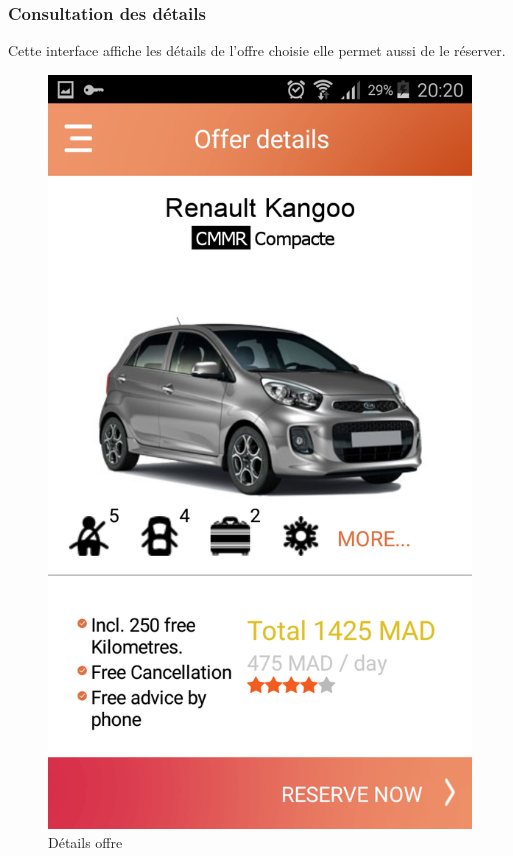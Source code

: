 \documentclass[12pt,a4paper]{report}
\begin{document}
	\subsubsection{Consultation des détails}
Cette interface affiche les détails de l'offre choisie elle permet aussi de le réserver.
	\vspace{2cm}
	\begin{figure}[!hbtp]
		\centering
		\includegraphics[scale=0.2]{./graphics/DetailsOffre.png}
		\caption{Détails offre}
		\end{figure}
		\newpage
\end{document}
